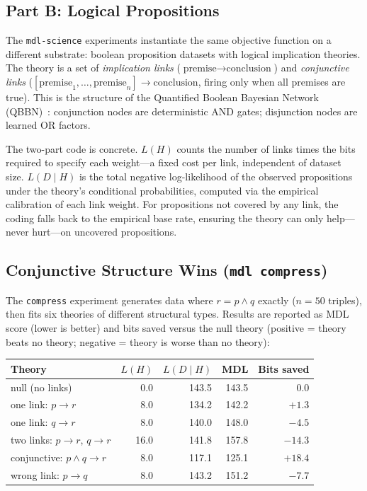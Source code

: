 \subsection*{Part B: Logical Propositions}

The \texttt{mdl-science} experiments instantiate the same objective
function on a different substrate: boolean proposition datasets with
logical implication theories. The theory is a set of
\emph{implication links} ($\text{premise} \to \text{conclusion}$) and
\emph{conjunctive links} ($[\text{premise}_1, \ldots, \text{premise}_n]
\to \text{conclusion}$, firing only when all premises are true). This
is the structure of the Quantified Boolean Bayesian Network
(QBBN)~\cite{coppola2024qbbn}: conjunction nodes are deterministic AND
gates; disjunction nodes are learned OR factors.

The two-part code is concrete. $L(H)$ counts the number of links times
the bits required to specify each weight---a fixed cost per link,
independent of dataset size. $L(D \mid H)$ is the total negative
log-likelihood of the observed propositions under the theory's
conditional probabilities, computed via the empirical calibration of
each link weight. For propositions not covered by any link, the coding
falls back to the empirical base rate, ensuring the theory can only
help---never hurt---on uncovered propositions.

\subsection{Conjunctive Structure Wins (\texttt{mdl compress})}

The \texttt{compress} experiment generates data where $r = p \wedge q$
exactly ($n = 50$ triples), then fits six theories of different
structural types. Results are reported as MDL score (lower is better)
and bits saved versus the null theory (positive = theory beats no
theory; negative = theory is worse than no theory):

\begin{center}
\begin{tabular}{lrrrr}
\toprule
Theory & $L(H)$ & $L(D \mid H)$ & MDL & Bits saved \\
\midrule
null (no links)                          &  0.0 & 143.5 & 143.5 &       0.0 \\
one link: $p \to r$                      &  8.0 & 134.2 & 142.2 &    $+1.3$ \\
one link: $q \to r$                      &  8.0 & 140.0 & 148.0 &    $-4.5$ \\
two links: $p \to r$, $q \to r$          & 16.0 & 141.8 & 157.8 &   $-14.3$ \\
conjunctive: $p \wedge q \to r$          &  8.0 & 117.1 & 125.1 & $\mathbf{+18.4}$ \\
wrong link: $p \to q$                    &  8.0 & 143.2 & 151.2 &    $-7.7$ \\
\bottomrule
\end{tabular}
\end{center}

